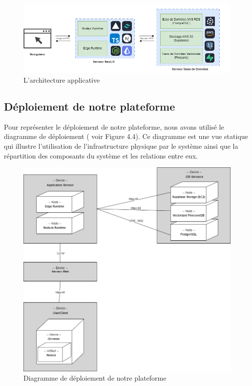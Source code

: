 \begin{figure}[H]
    \centering
    \includegraphics[width=1.2\textwidth, height=0.4\textwidth]{images/chp4/fig3.png}
    \caption{L’architecture applicative}
    \label{fig:architecture-applicative}    
\end{figure}

\subsection{Déploiement de notre plateforme}
Pour représenter le déploiement de notre plateforme, nous avons utilisé le diagramme de déploiement ( voir Figure 4.4). Ce diagramme est une vue statique qui illustre l'utilisation de l'infrastructure physique par le système ainsi que la  répartition des composants du système et les relations entre eux.
\begin{figure}[H]
    \centering
    \includegraphics[width=\textwidth,height=0.8\textwidth]{images/chp4/fig4.png}
    \caption{Diagramme de déploiement de notre plateforme}
    \label{fig:Diagramme de déploiement de notre plateforme}    
\end{figure}

